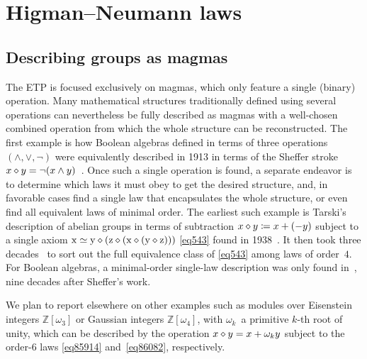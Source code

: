\section{Higman--Neumann laws}\label{higman-neumann}

\subsection{Describing groups as magmas}

The ETP is focused exclusively on magmas, which only feature a single (binary) operation.  Many mathematical structures traditionally defined using several operations can nevertheless be fully described as magmas with a well-chosen combined operation from which the whole structure can be reconstructed.  The first example is how Boolean algebras defined in terms of three operations $(\land,\lor,\lnot)$ were equivalently described in 1913 in terms of the Sheffer stroke $x\diamond y=\lnot(x\land y)$~\cite{sheffer}.  Once such a single operation is found, a separate endeavor is to determine which laws it must obey to get the desired structure, and, in favorable cases find a single law that encapsulates the whole structure, or even find all equivalent laws of minimal order.  The earliest such example is Tarski's description of abelian groups in terms of subtraction $x\diamond y\coloneqq x+(-y)$ subject to a single axiom $\mathrm{x} \simeq \mathrm{y} \diamond (\mathrm{z} \diamond (\mathrm{x} \diamond (\mathrm{y} \diamond \mathrm{z})))$ \eqref{eq543} found in 1938~\cite{Tarski1938}.  It then took three decades~\cite{higman-neumann,Sholander01021959,Padmanabhan_1969} to sort out the full equivalence class of \eqref{eq543} among laws of order~$4$.  For Boolean algebras, a minimal-order single-law description was only found in~\cite{mccune_et_al}, nine decades after Sheffer's work.

We plan to report elsewhere on other examples such as modules over Eisenstein integers $\mathbb{Z}[\omega_3]$ or Gaussian integers $\mathbb{Z}[\omega_4]$, with $\omega_k$~a primitive $k$-th root of unity, which can be described by the operation $x \diamond y = x + \omega_k y$ subject to the order-$6$ laws \eqref{eq85914} and~\eqref{eq86082}, respectively.


